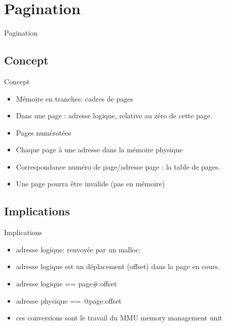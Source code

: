 \def\sectitle{Pagination}
\section{\sectitle}
\begin{frame}{\sectitle}
\def\subsectitle{Concept}
\subsection{\subsectitle}
\begin{block}{\subsectitle}
\begin{itemize}
    \item Mémoire en tranches: cadres de pages
    \item Dans une page : adresse logique, relative au zéro de cette page.
    \item Pages numérotées
    \item Chaque page à une adresse dans la mémoire physique
    \item Correspondance numéro de page/adresse page : la table de pages.
    \item Une page pourra être invalide (pas en mémoire)
\end{itemize}
\end{block}
\def\subsectitle{Implications}
\subsection{\subsectitle}
\begin{exampleblock}{\subsectitle}
\begin{itemize}
    \item adresse logique: renvoyée par un malloc;
    \item adresse logique est un déplacement (offset) dans la page en cours.
    \item adresse logique == page\#:offset
    \item adresse physique == @page:offset
    \item ces conversions sont le travail du MMU memory management unit
\end{itemize}
\end{exampleblock}
\end{frame}

